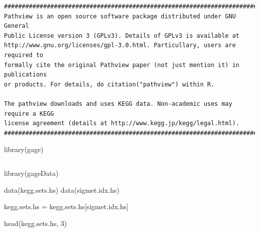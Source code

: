 \documentclass[
  letterpaper,
  DIV=11,
  numbers=noendperiod]{scrartcl}
\newenvironment{Shaded}{\begin{snugshade}}{\end{snugshade}}
\newcommand{\DecValTok}[1]{\textcolor[rgb]{0.68,0.00,0.00}{#1}}
\newcommand{\FunctionTok}[1]{\textcolor[rgb]{0.28,0.35,0.67}{#1}}
\newcommand{\NormalTok}[1]{\textcolor[rgb]{0.00,0.23,0.31}{#1}}
\newcommand{\OtherTok}[1]{\textcolor[rgb]{0.00,0.23,0.31}{#1}}
\begin{document}
\begin{verbatim}
##############################################################################
Pathview is an open source software package distributed under GNU General
Public License version 3 (GPLv3). Details of GPLv3 is available at
http://www.gnu.org/licenses/gpl-3.0.html. Particullary, users are required to
formally cite the original Pathview paper (not just mention it) in publications
or products. For details, do citation("pathview") within R.

The pathview downloads and uses KEGG data. Non-academic uses may require a KEGG
license agreement (details at http://www.kegg.jp/kegg/legal.html).
##############################################################################
\end{verbatim}

\begin{Shaded}
\begin{Highlighting}[]
\FunctionTok{library}\NormalTok{(gage)}
\end{Highlighting}
\end{Shaded}

\begin{verbatim}
\end{verbatim}

\begin{Shaded}
\begin{Highlighting}[]
\FunctionTok{library}\NormalTok{(gageData)}
\end{Highlighting}
\end{Shaded}

\begin{Shaded}
\begin{Highlighting}[]
\FunctionTok{data}\NormalTok{(kegg.sets.hs)}
\FunctionTok{data}\NormalTok{(sigmet.idx.hs)}

\NormalTok{kegg.sets.hs }\OtherTok{=}\NormalTok{ kegg.sets.hs[sigmet.idx.hs]}

\FunctionTok{head}\NormalTok{(kegg.sets.hs, }\DecValTok{3}\NormalTok{)}
\end{Highlighting}
\end{Shaded}
\end{document}
